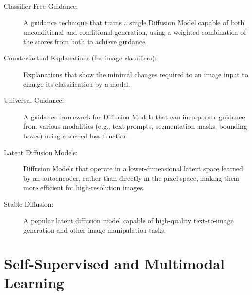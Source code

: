 \begin{description}
  \item[Classifier-Free Guidance:] A guidance technique that trains a single Diffusion Model capable of both unconditional and conditional generation, using a weighted combination of the scores from both to achieve guidance.
  \item[Counterfactual Explanations (for image classifiers):] Explanations that show the minimal changes required to an image input to change its classification by a model.
  \item[Universal Guidance:] A guidance framework for Diffusion Models that can incorporate guidance from various modalities (e.g., text prompts, segmentation masks, bounding boxes) using a shared loss function.
  \item[Latent Diffusion Models:] Diffusion Models that operate in a lower-dimensional latent space learned by an autoencoder, rather than directly in the pixel space, making them more efficient for high-resolution images.
  \item[Stable Diffusion:] A popular latent diffusion model capable of high-quality text-to-image generation and other image manipulation tasks.
\end{description}

\section{Self-Supervised and Multimodal Learning}

